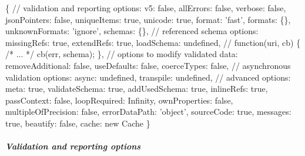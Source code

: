 \begin{DoxyCode}
\{
  // validation and reporting options:
  v5:               false,
  allErrors:        false,
  verbose:          false,
  jsonPointers:     false,
  uniqueItems:      true,
  unicode:          true,
  format:           'fast',
  formats:          \{\},
  unknownFormats:   'ignore',
  schemas:          \{\},
  // referenced schema options:
  missingRefs:      true,
  extendRefs:       true,
  loadSchema:       undefined, // function(uri, cb) \{ /* ... */ cb(err, schema); \},
  // options to modify validated data:
  removeAdditional: false,
  useDefaults:      false,
  coerceTypes:      false,
  // asynchronous validation options:
  async:            undefined,
  transpile:        undefined,
  // advanced options:
  meta:             true,
  validateSchema:   true,
  addUsedSchema:    true,
  inlineRefs:       true,
  passContext:      false,
  loopRequired:     Infinity,
  ownProperties:    false,
  multipleOfPrecision: false,
  errorDataPath:    'object',
  sourceCode:       true,
  messages:         true,
  beautify:         false,
  cache:            new Cache
\}
\end{DoxyCode}


\subparagraph*{Validation and reporting options}


